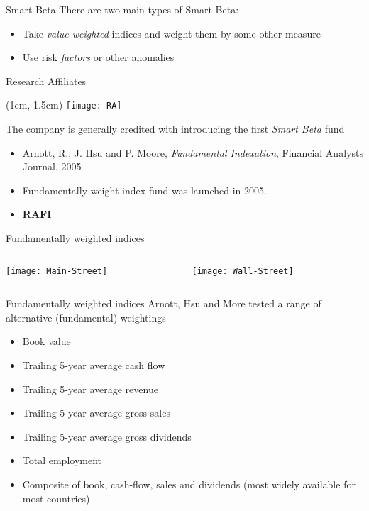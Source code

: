 \documentclass[14pt,xcolor=pdftex,dvipsnames,table]{beamer}\usepackage[]{graphicx}\usepackage[]{color}
\begin{document}
\begin{frame}{Smart Beta}
There are two main types of Smart Beta:
\begin{itemize}[<+-| alert@+>]
\pause
\item Take \emph{value-weighted} indices and weight them by some other measure
\item Use risk \emph{factors} or other anomalies 
\end{itemize}
\end{frame}

\begin{frame}{Research Affiliates}
\begin{textblock*}{3cm}(1cm, 1.5cm)
\texttt{[image: RA]}
\end{textblock*}
The company is generally credited with introducing the first \emph{Smart Beta} fund 
\begin{itemize}[<+-| alert@+>]
\pause
\item Arnott, R., J. Hsu and P. Moore, \emph{Fundamental Indexation}, Financial Analysts Journal, 2005
\item Fundamentally-weight index fund was launched in 2005. 
\item \textbf{RAFI}
\end{itemize}
\end{frame}

\begin{frame}{Fundamentally weighted indices}
\begin{columns}{}
\begin{column}{0.48\linewidth}
\texttt{[image: Main-Street]}
\end{column}
\begin{column}{0.47\linewidth}
\texttt{[image: Wall-Street]}
\end{column}
\end{columns}
\end{frame}

\begin{frame}{Fundamentally weighted indices}
Arnott, Hsu and More tested a range of alternative (fundamental) weightings
\begin{itemize}[<+-| alert@+>]
\pause
\item Book value
\item Trailing 5-year average cash flow
\item Trailing 5-year average revenue
\item Trailing 5-year average gross sales
\item Trailing 5-year average gross dividends
\item Total employment
\item Composite of book, cash-flow, sales and dividends (most widely available for most countries)
\end{itemize}
\end{frame}
\end{document}
